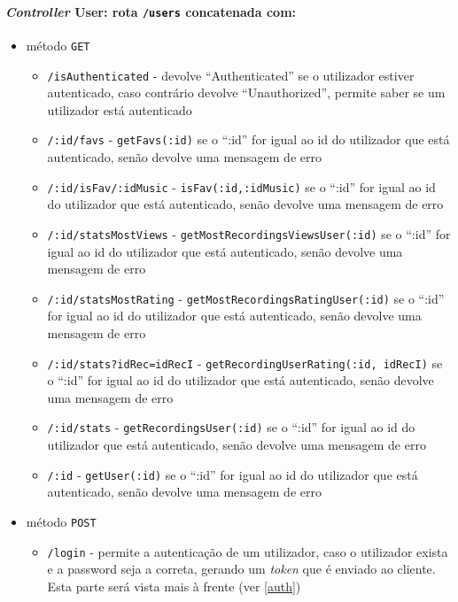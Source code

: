 \documentclass{article}
\begin{document}
\paragraph{\textit{Controller} User: rota \texttt{/users} concatenada com:}
    \begin{itemize}
        \item método \texttt{GET}
            \begin{itemize}
                \item \texttt{/isAuthenticated} - devolve ``Authenticated'' se o utilizador estiver autenticado, caso contrário devolve ``Unauthorized'', permite saber se um utilizador está autenticado
                \item \texttt{/:id/favs} - \texttt{getFavs(:id)} se o ``:id'' for igual ao id do utilizador que está autenticado, senão devolve uma mensagem de erro
                \item \texttt{/:id/isFav/:idMusic} - \texttt{isFav(:id,:idMusic)} se o ``:id'' for igual ao id do utilizador que está autenticado, senão devolve uma mensagem de erro
                \item \texttt{/:id/statsMostViews} - \texttt{getMostRecordingsViewsUser(:id)} se o ``:id'' for igual ao id do utilizador que está autenticado, senão devolve uma mensagem de erro
                \item \texttt{/:id/statsMostRating} - \texttt{getMostRecordingsRatingUser(:id)} se o ``:id'' for igual ao id do utilizador que está autenticado, senão devolve uma mensagem de erro
                \item \texttt{/:id/stats?idRec=idRecI} - \texttt{getRecordingUserRating(:id, idRecI)} se o ``:id'' for igual ao id do utilizador que está autenticado, senão devolve uma mensagem de erro
                \item \texttt{/:id/stats} - \texttt{getRecordingsUser(:id)} se o ``:id'' for igual ao id do utilizador que está autenticado, senão devolve uma mensagem de erro
                \item \texttt{/:id} - \texttt{getUser(:id)} se o ``:id'' for igual ao id do utilizador que está autenticado, senão devolve uma mensagem de erro
            \end{itemize}
        \item método \texttt{POST}
            \begin{itemize}
                \item \texttt{/login} - permite a autenticação de um utilizador, caso o utilizador exista e a password seja a correta, gerando um \textit{token} que é enviado ao cliente. Esta parte será vista mais à frente (ver \ref{auth}) 

\end{itemize}
\end{itemize}
\end{document}
